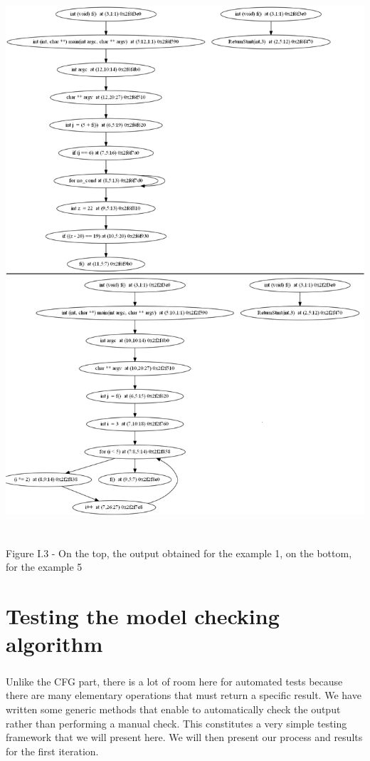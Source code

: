 \documentclass{report}
\begin{document}
\begin{center}
\includegraphics[scale=0.4]{data/for_example}
~\\~\\Figure I.3 - On the top, the output obtained for the example 1, on the bottom, for the example 5
\end{center}

\chapter{Testing the model checking algorithm}

\paragraph{}
\hspace{4mm}Unlike the CFG part, there is a lot of room here for automated tests because there are many elementary operations that must return a specific result. We have written some generic methods 
that enable to automatically check the output rather than performing a manual check. This constitutes a very simple 
testing framework that we will present here. We will then present our process and results for the first iteration.
\end{document}
